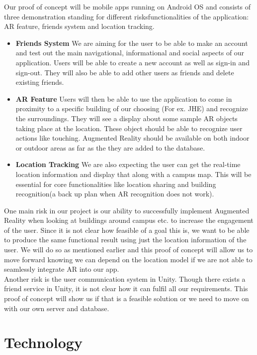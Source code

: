 \documentclass{article}
\begin{document}
Our proof of concept will be mobile apps running on Android OS and consists of three demonstration standing for different risks\/functionalities of the application: AR feature, friends system and location tracking. 
\begin{itemize}
	\item \textbf{Friends System} We are aiming for the user to be able to make an account and test out the main navigational, informational and social aspects of our application. Users will be able to create a new account as well as sign-in and sign-out. They will also be able to add other users as friends and delete existing friends. 
	\item \textbf{AR Feature} Users will then be able to use the application to come in proximity to a specific building of our choosing (For ex. JHE) and recognize the surroundings. They will see a display about some sample AR objects taking place at the location. These object should be able to recognize user actions like touching. Augmented Reality should be available on both indoor or outdoor areas as far as the they are added to the database.
	\item \textbf{Location Tracking} We are also expecting the user can get the real-time location information and display that along with a campus map. This will be essential for core functionalities like location sharing and building recognition(a back up plan when AR recognition does not work).
\end{itemize}
One main risk in our project is our ability to successfully implement Augmented Reality when looking at buildings around campus etc. to increase the engagement of the user. Since it is not clear how feasible of a goal this is, we want to be able to produce the same functional result using just the location information of the user. We will do so as mentioned earlier and this proof of concept will allow us to move forward knowing we can depend on the location model if we are not able to seamlessly integrate AR into our app.\\
Another risk is the user communication system in Unity. Though there exists a friend service in Unity, it is not clear how it can fulfil all our requirements. This proof of concept will show us if that is a feasible solution or we need to move on with our own server and database.

\section{Technology}
\end{document}
